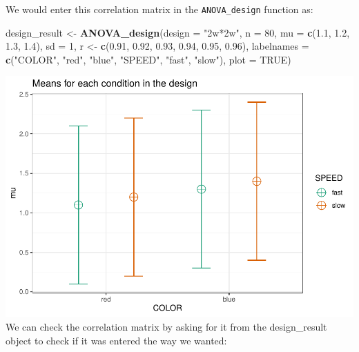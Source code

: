 \documentclass[
]{book}
\newenvironment{Shaded}{\begin{snugshade}}{\end{snugshade}}
\newcommand{\DataTypeTok}[1]{\textcolor[rgb]{0.13,0.29,0.53}{#1}}
\newcommand{\DecValTok}[1]{\textcolor[rgb]{0.00,0.00,0.81}{#1}}
\newcommand{\FloatTok}[1]{\textcolor[rgb]{0.00,0.00,0.81}{#1}}
\newcommand{\KeywordTok}[1]{\textcolor[rgb]{0.13,0.29,0.53}{\textbf{#1}}}
\newcommand{\NormalTok}[1]{#1}
\newcommand{\OtherTok}[1]{\textcolor[rgb]{0.56,0.35,0.01}{#1}}
\newcommand{\StringTok}[1]{\textcolor[rgb]{0.31,0.60,0.02}{#1}}
\begin{document}
\newpage

We would enter this correlation matrix in the \texttt{ANOVA\_design} function as:

\begin{Shaded}
\begin{Highlighting}[]
\NormalTok{design_result <-}\StringTok{ }\KeywordTok{ANOVA_design}\NormalTok{(}\DataTypeTok{design =} \StringTok{"2w*2w"}\NormalTok{,}
                              \DataTypeTok{n =} \DecValTok{80}\NormalTok{,}
                              \DataTypeTok{mu =} \KeywordTok{c}\NormalTok{(}\FloatTok{1.1}\NormalTok{, }\FloatTok{1.2}\NormalTok{, }
                                     \FloatTok{1.3}\NormalTok{, }\FloatTok{1.4}\NormalTok{),}
                              \DataTypeTok{sd =} \DecValTok{1}\NormalTok{,}
\NormalTok{                              r <-}\StringTok{ }\KeywordTok{c}\NormalTok{(}\FloatTok{0.91}\NormalTok{, }\FloatTok{0.92}\NormalTok{, }
                                     \FloatTok{0.93}\NormalTok{, }\FloatTok{0.94}\NormalTok{, }
                                     \FloatTok{0.95}\NormalTok{, }\FloatTok{0.96}\NormalTok{),}
                              \DataTypeTok{labelnames =} \KeywordTok{c}\NormalTok{(}\StringTok{"COLOR"}\NormalTok{, }
                                             \StringTok{"red"}\NormalTok{, }\StringTok{"blue"}\NormalTok{, }
                                             \StringTok{"SPEED"}\NormalTok{, }
                                             \StringTok{"fast"}\NormalTok{, }\StringTok{"slow"}\NormalTok{),}
                              \DataTypeTok{plot =} \OtherTok{TRUE}\NormalTok{)}
\end{Highlighting}
\end{Shaded}

\includegraphics{SuperpowerValidation_files/figure-latex/unnamed-chunk-4-1.pdf}
\newpage
We can check the correlation matrix by asking for it from the design\_result object to check if it was entered the way we wanted:
\end{document}
